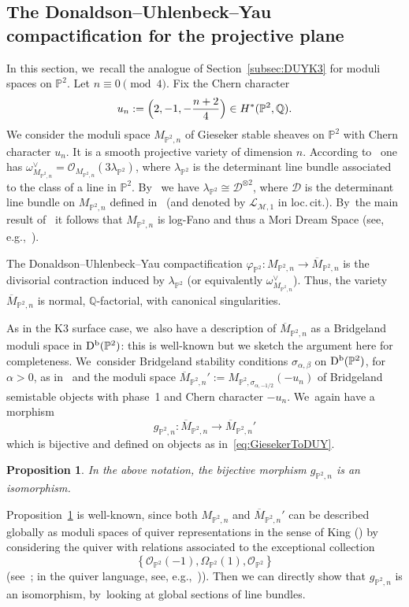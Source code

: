 \documentclass[11pt]{article}
\newcommand{\Subsection}{\subsection}
\newcommand{\PP}{{\mathbb P}}\let\P\PP
\newcommand{\QQ}{{\mathbb Q}}\let\Q\QQ
\newcommand\cD{\mathcal{D}}
\newcommand\cL{\mathcal{L}}
\newcommand\cM{\mathcal{M}}
\newcommand\cO{\mathcal{O}}
\DeclareMathOperator{\Db}{D^{\textup b}}
\let\phi\varphi
\newtheorem{prop}[lemm]{Proposition}
\theoremstyle{definition}
\begin{document}
\Subsection{The Donaldson--Uhlenbeck--Yau compactification for the projective plane}\label{subsec:DUYP2}

In this section, we~recall the analogue of Section~\ref{subsec:DUYK3} for moduli spaces on $\PP^2$.
Let $n\equiv 0 \pmod 4$.
Fix the Chern character
\[
u_n:=\Bigl(2, -1, -\frac{n+2}{4} \Bigr)\in H^*(\PP^2,\QQ).
\]
We consider the moduli space $M_{\PP^2,n}$ of Gieseker stable sheaves on $\PP^2$ with Chern character $u_n$.
It is a smooth projective variety of dimension $n$. According to~\cite[Th.\,8.3.3]{HL:moduli} one has $\omega_{M_{\PP^2,n}}^\vee = \cO_{M_{\PP^2,n}}(3\lambda_{\PP^2})$, where $\lambda_{\PP^2}$ is the determinant line bundle associated to the class of a line in $\PP^2$. By~\cite[Lem.\,8.3.4]{HL:moduli} we have $\lambda_{\PP^2}\cong \cD^{\otimes 2}$, where $\cD$ is the determinant line bundle on $M_{\PP^2,n}$ defined in~\cite{Li:uhlencomp} (and denoted by $\cL_{\cM,1}$ in loc.\,cit.). By~the main result of~\cite{Li:uhlencomp} it follows that $M_{\PP^2,n}$ is log-Fano and thus a Mori Dream Space (see, e.g.,~\cite[Ex.\,3.2]{Castravet:MDS}).

The Donaldson--Uhlenbeck--Yau compactification $\phi_{\PP^2}\colon M_{\PP^2,n}\to \overline{M}_{\PP^2,n}$ is the divisorial contraction induced by $\lambda_{\PP^2}$ (or equivalently $\omega_{M_{\PP^2,n}}^\vee$).
Thus, the variety $\overline{M}_{\PP^2,n}$ is normal, $\QQ$-factorial, with canonical singularities.

As in the K3 surface case, we~also have a description of $\overline{M}_{\PP^2,n}$ as a Bridgeland moduli space in $\Db(\PP^2)$: this is well-known but we sketch the argument here for completeness. We~consider Bridgeland stability conditions $\sigma_{\alpha,\beta}$ on $\Db(\PP^2)$, for $\alpha>0$, as in~\cite[Th.\,6.10]{MS:lectures} and the moduli space $\overline{M}_{\PP^2,n}':=M_{\PP^2,\sigma_{\alpha,-1/2}}(-u_n)$ of Bridgeland semistable objects with phase~1 and Chern character $-u_n$. We~again have a morphism
\[
g_{\PP^2,n}\colon \overline{M}_{\PP^2,n} \to \overline{M}_{\PP^2,n}'
\]
which is bijective and defined on objects as in~\eqref{eq:GiesekerToDUY}.

\begin{prop}\label{prop:UhlenbeckVsBridgelandP2}
In the above notation, the bijective morphism $g_{\PP^2,n}$ is an isomorphism.
\end{prop}

Proposition~\ref{prop:UhlenbeckVsBridgelandP2} is well-known, since both $M_{\PP^2,n}$ and $\overline{M}_{\PP^2,n}'$ can be described globally as moduli spaces of quiver representations in the sense of King (\cite{King:Moduli}) by considering the quiver with relations associated to the exceptional collection
\[
\left\{\cO_{\PP^2}(-1), \Omega_{\PP^2}(1), \cO_{\PP^2} \right\}
\]
(see~\cite{DLP}; in the quiver language, see, e.g.,~\cite[Main\,Th.\,1.3]{Okhawa:P2})).
Then we can directly show that $g_{\PP^2,n}$ is an isomorphism, by~looking at global sections of line bundles.
\end{document}

